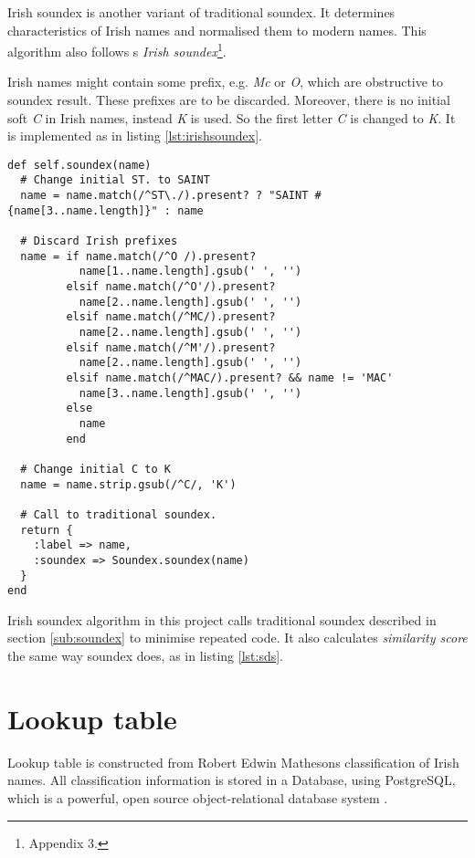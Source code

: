 Irish soundex is another variant of traditional soundex. It determines
characteristics of Irish names and normalised them to modern names.
This algorithm also follows \citeauthor{adamw}\textquotesingle s
\emph{Irish soundex}\footnote{\cite{adamw} Appendix 3.}.

Irish names might contain some prefix, e.g. \emph{Mc} or \emph{O},
which are obstructive to soundex result. These prefixes are to be
discarded. Moreover, there is no initial soft \emph{C} in Irish names,
instead \emph{K} is used. So the first letter \emph{C} is changed to \emph{K}.
It is implemented as in listing \ref{lst:irishsoundex}.

\begin{minipage}{\linewidth}
\begin{lstlisting}[label={lst:irishsoundex}, caption={Irish soundex implementation.}]
def self.soundex(name)
  # Change initial ST. to SAINT
  name = name.match(/^ST\./).present? ? "SAINT #{name[3..name.length]}" : name

  # Discard Irish prefixes
  name = if name.match(/^O /).present?
           name[1..name.length].gsub(' ', '')
         elsif name.match(/^O'/).present?
           name[2..name.length].gsub(' ', '')
         elsif name.match(/^MC/).present?
           name[2..name.length].gsub(' ', '')
         elsif name.match(/^M'/).present?
           name[2..name.length].gsub(' ', '')
         elsif name.match(/^MAC/).present? && name != 'MAC'
           name[3..name.length].gsub(' ', '')
         else
           name
         end

  # Change initial C to K
  name = name.strip.gsub(/^C/, 'K')

  # Call to traditional soundex.
  return {
    :label => name,
    :soundex => Soundex.soundex(name)
  }
end
\end{lstlisting}
\end{minipage}

Irish soundex algorithm in this project calls traditional soundex
described in section \ref{sub:soundex} to minimise repeated code.
It also calculates \emph{similarity score} the same way
soundex does, as in listing \ref{lst:sds}.

\section{Lookup table}

Lookup table is constructed from Robert Edwin Matheson\textquotesingle s
classification of Irish names. All classification information
is stored in a Database, using PostgreSQL, which is a powerful,
open source object-relational database system \cite[]{postgresql}.

